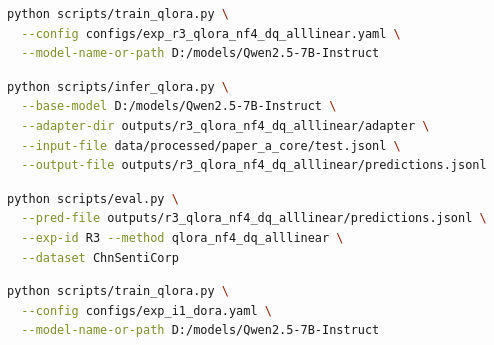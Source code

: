 \documentclass[12pt,a4paper]{article}
\begin{document}
\begin{lstlisting}[language=bash,caption=R3 训练命令]
python scripts/train_qlora.py \
  --config configs/exp_r3_qlora_nf4_dq_alllinear.yaml \
  --model-name-or-path D:/models/Qwen2.5-7B-Instruct
\end{lstlisting}

\begin{lstlisting}[language=bash,caption=R3 推理命令]
python scripts/infer_qlora.py \
  --base-model D:/models/Qwen2.5-7B-Instruct \
  --adapter-dir outputs/r3_qlora_nf4_dq_alllinear/adapter \
  --input-file data/processed/paper_a_core/test.jsonl \
  --output-file outputs/r3_qlora_nf4_dq_alllinear/predictions.jsonl
\end{lstlisting}

\begin{lstlisting}[language=bash,caption=评测命令]
python scripts/eval.py \
  --pred-file outputs/r3_qlora_nf4_dq_alllinear/predictions.jsonl \
  --exp-id R3 --method qlora_nf4_dq_alllinear \
  --dataset ChnSentiCorp
\end{lstlisting}

\begin{lstlisting}[language=bash,caption=I1 DoRA 训练命令]
python scripts/train_qlora.py \
  --config configs/exp_i1_dora.yaml \
  --model-name-or-path D:/models/Qwen2.5-7B-Instruct
\end{lstlisting}
\end{document}
